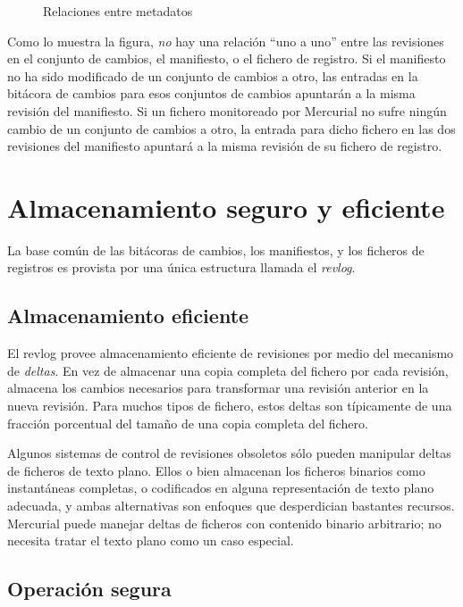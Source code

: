 \begin{figure}[ht]
  \centering
  \caption{Relaciones entre metadatos}
  \label{fig:concepts:metadata}
\end{figure}

Como lo muestra la figura, \emph{no} hay una relación ``uno a uno''
entre las revisiones en el conjunto de cambios, el manifiesto, o el
fichero de registro. Si el manifiesto no ha sido modificado de un
conjunto de cambios a otro, las entradas en la bitácora de cambios
para esos conjuntos de cambios apuntarán a la misma revisión del
manifiesto. Si un fichero monitoreado por Mercurial no sufre ningún
cambio de un conjunto de cambios a otro, la entrada para dicho fichero
en las dos revisiones del manifiesto apuntará a la misma revisión de
su fichero de registro.

\section{Almacenamiento seguro y eficiente}

La base común de las bitácoras de cambios, los manifiestos, y los
ficheros de registros es provista por una única estructura llamada el
\emph{revlog}.

\subsection{Almacenamiento eficiente}

El revlog provee almacenamiento eficiente de revisiones por medio del
mecanismo de \emph{deltas}.  En vez de almacenar una
copia completa del fichero por cada revisión, almacena los cambios
necesarios para transformar una revisión anterior en la nueva
revisión. Para muchos tipos de fichero, estos deltas son típicamente
de una fracción porcentual del tamaño de una copia completa del
fichero.

Algunos sistemas de control de revisiones obsoletos sólo pueden
manipular deltas de ficheros de texto plano. Ellos o bien almacenan
los ficheros binarios como instantáneas completas, o codificados en
alguna representación de texto plano adecuada, y ambas alternativas
son enfoques que desperdician bastantes recursos. Mercurial puede
manejar deltas de ficheros con contenido binario arbitrario; no
necesita tratar el texto plano como un caso especial.

\subsection{Operación segura}
\label{sec:concepts:txn}

